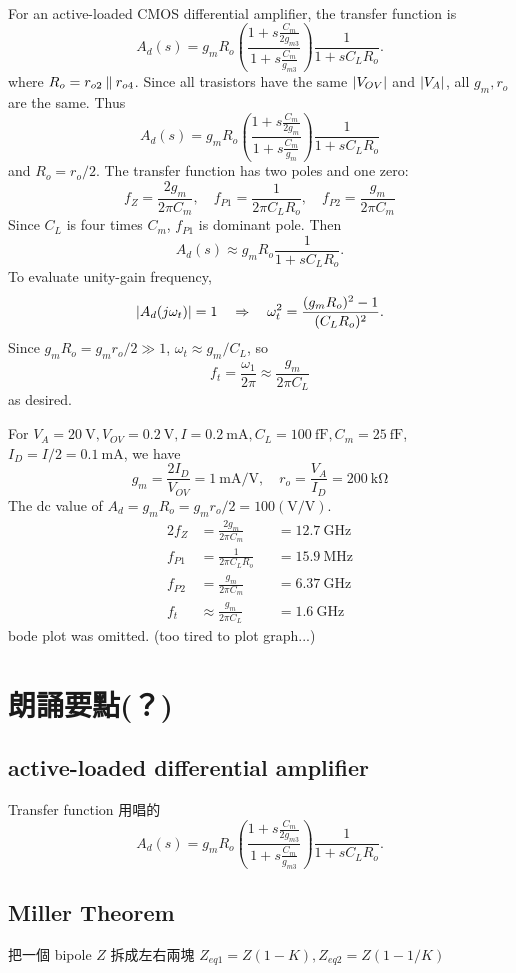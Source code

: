 \documentclass[12pt, a4paper]{article}
\begin{document}
\Ans \\
For an active-loaded CMOS differential amplifier, the transfer function is
\[
  A_d(s) = g_mR_o\left(\frac{1+s\frac{C_m}{2g_{m3}}}{1+s\frac{C_m}{g_{m3}}}\right)
      \frac{1}{1+sC_LR_o}.
\]
where $R_o = r_{o2} \mathbin{\|} r_{o4}$.
Since all trasistors have the same $\lvert V_{OV}\rvert$ and $\lvert V_A\rvert$, all
$g_m, r_o$ are the same. Thus
\[
  A_d(s) = g_mR_o\left(\frac{1+s\frac{C_m}{2g_m}}{1+s\frac{C_m}{g_m}}\right)
      \frac{1}{1+sC_LR_o}
\]
and $R_o = r_o / 2$. The transfer function has two poles and one zero:
\[
  f_Z = \frac{2g_m}{2\pi C_m}, \quad
  f_{P1} = \frac{1}{2\pi C_LR_o}, \quad
  f_{P2} = \frac{g_m}{2\pi C_m}
\]
Since $C_L$ is four times $C_m$, $f_{P1}$ is dominant pole. Then
\[
  A_d(s) \approx g_mR_o \frac{1}{1+sC_LR_o}.
\]
To evaluate unity-gain frequency,
\[
  \lvert A_d(j\omega_t)\rvert = 1 \quad \Rightarrow \quad
  \omega_t^2 = \frac{(g_mR_o)^2 - 1}{(C_LR_o)^2}.
\]
Since $g_mR_o = g_mr_o/2 \gg 1$, $\omega_t \approx g_m/C_L$, so
\[
  f_t = \frac{\omega_1}{2\pi} \approx \frac{g_m}{2\pi C_L}
\]
as desired.

For $V_A=\SI{20}{\V}, V_{OV}=\SI{0.2}{\V}, I=\SI{0.2}{\mA},
C_L=\SI{100}{\fF},C_m=\SI{25}{\fF}$, $I_D = I/2=\SI{0.1}{\mA}$, we have
\[
  g_m = \frac{2I_D}{V_{OV}} = \SI{1}{\mA/\V}, \quad
  r_o = \frac{V_A}{I_D} = \SI{200}{\kohm}
\]
The dc value of $A_d = g_mR_o = g_mr_o/2 = 100(\si{\V/\V})$.
\begin{alignat*}{2}
  f_Z &= \frac{2g_m}{2\pi C_m} & &= \SI{12.7}{\GHz} \\
  f_{P1} &= \frac{1}{2\pi C_LR_o} & &= \SI{15.9}{\MHz} \\
  f_{P2} &= \frac{g_m}{2\pi C_m} & &= \SI{6.37}{\GHz} \\
  f_t &\approx \frac{g_m}{2\pi C_L} & &= \SI{1.6}{\GHz}
\end{alignat*}
bode plot was omitted. (too tired to plot graph...)

\section{朗誦要點(？)}
\subsection{active-loaded differential amplifier}
Transfer function 用唱的
\[
  A_d(s) = g_mR_o\left(\frac{1+s\frac{C_m}{2g_{m3}}}{1+s\frac{C_m}{g_{m3}}}\right)
      \frac{1}{1+sC_LR_o}.
\]
\subsection{Miller Theorem}
把一個 bipole $Z$ 拆成左右兩塊
$Z_{eq1} = Z (1-K), Z_{eq2} = Z (1 - 1/K)$
\end{document}
